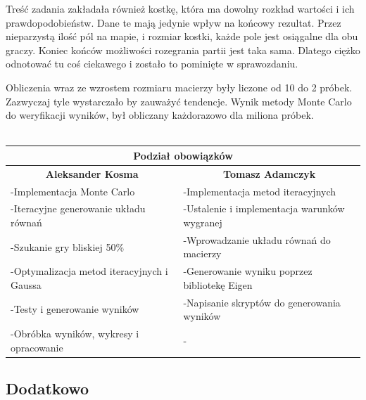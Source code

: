 \documentclass[8pt]{article}
\begin{document}
Treść zadania zakładała również kostkę, która ma dowolny rozkład wartości i ich prawdopodobieństw. Dane te mają jedynie wpływ na końcowy rezultat. Przez nieparzystą ilość pól na mapie, i rozmiar kostki, każde pole jest osiągalne dla obu graczy. Koniec końców możliwości rozegrania partii jest taka sama. Dlatego ciężko odnotować tu coś ciekawego i zostało to pominięte w sprawozdaniu.

Obliczenia wraz ze wzrostem rozmiaru macierzy były liczone od 10 do 2 próbek. Zazwyczaj tyle wystarczało by zauważyć tendencje. Wynik metody Monte Carlo do weryfikacji wyników, był obliczany każdorazowo dla miliona próbek.\\
\\
\begin{tabular}{ | p{8.2cm} | p{8.2cm} | }
  \hline
  \multicolumn{2}{|c|}{Podział obowiązków} \\
  \hline
  \multicolumn{1}{|c|}{\textbf{Aleksander Kosma} }& \multicolumn{1}{|c|}{\textbf{Tomasz Adamczyk}} \\
  \hline
  -Implementacja Monte Carlo & -Implementacja metod iteracyjnych \\\hline
   -Iteracyjne generowanie układu równań & -Ustalenie i implementacja warunków wygranej \\\hline
    -Szukanie gry bliskiej 50\% & -Wprowadzanie układu równań do macierzy \\\hline
  -Optymalizacja metod iteracyjnych i Gaussa & -Generowanie wyniku poprzez bibliotekę Eigen\\\hline
  -Testy i generowanie wyników & -Napisanie skryptów do generowania wyników \\\hline
  -Obróbka wyników, wykresy i opracowanie & - \\\hline
  
  \hline
\end{tabular}

\subsection*{Dodatkowo}
\end{document}
